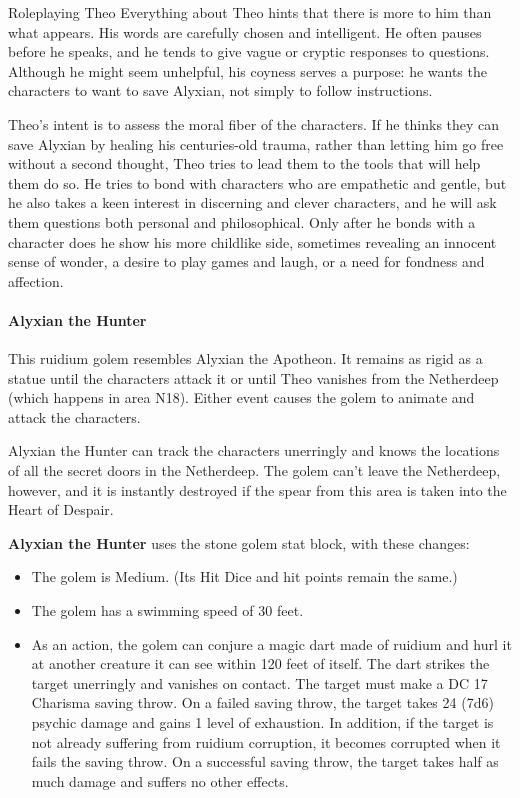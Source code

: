 \documentclass[10pt,a4paper,twoside,bg=print,twocolumn,openany,nodeprecatedcode]{dndbook}
\begin{document}
\begin{DndSidebar}[float=!b]{Roleplaying Theo}
Everything about Theo hints that there is more to him than what appears. His words are carefully chosen and intelligent. He often pauses before he speaks, and he tends to give vague or cryptic responses to questions. Although he might seem unhelpful, his coyness serves a purpose: he wants the characters to want to save Alyxian, not simply to follow instructions.



Theo's intent is to assess the moral fiber of the characters. If he thinks they can save Alyxian by healing his centuries-old trauma, rather than letting him go free without a second thought, Theo tries to lead them to the tools that will help them do so. He tries to bond with characters who are empathetic and gentle, but he also takes a keen interest in discerning and clever characters, and he will ask them questions both personal and philosophical. Only after he bonds with a character does he show his more childlike side, sometimes revealing an innocent sense of wonder, a desire to play games and laugh, or a need for fondness and affection.



\end{DndSidebar}

\paragraph{Alyxian the Hunter}
This ruidium golem resembles Alyxian the Apotheon. It remains as rigid as a statue until the characters attack it or until Theo vanishes from the Netherdeep (which happens in area N18). Either event causes the golem to animate and attack the characters.

Alyxian the Hunter can track the characters unerringly and knows the locations of all the secret doors in the Netherdeep. The golem can't leave the Netherdeep, however, and it is instantly destroyed if the spear from this area is taken into the Heart of Despair.

\textbf{Alyxian the Hunter} uses the stone golem stat block, with these changes:


\begin{itemize}
\item The golem is Medium. (Its Hit Dice and hit points remain the same.)
\item The golem has a swimming speed of 30 feet.
\item As an action, the golem can conjure a magic dart made of ruidium and hurl it at another creature it can see within 120 feet of itself. The dart strikes the target unerringly and vanishes on contact. The target must make a DC 17 Charisma saving throw. On a failed saving throw, the target takes 24 (7d6) psychic damage and gains 1 level of exhaustion. In addition, if the target is not already suffering from ruidium corruption, it becomes corrupted when it fails the saving throw. On a successful saving throw, the target takes half as much damage and suffers no other effects.
\end{itemize}
\end{document}
